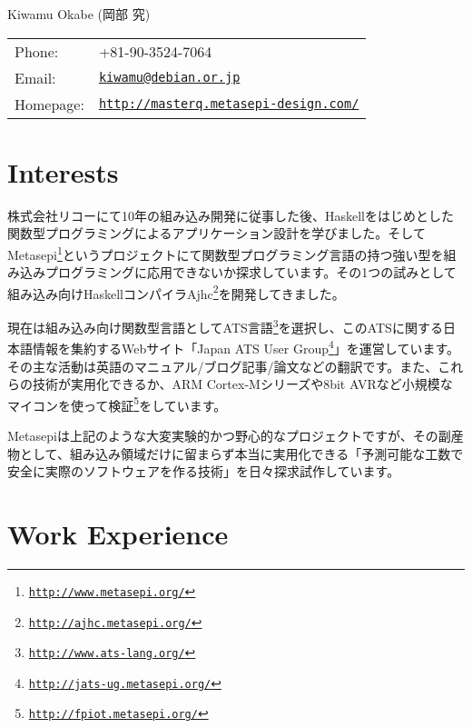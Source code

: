 \documentclass[letterpaper]{article}
\def\name{Kiwamu Okabe (岡部 究)}
\begin{document}
{\huge \name}


\vspace{0.25in}

\begin{minipage}{0.3\linewidth}
  \begin{tabular}{ll}
    Phone: & +81-90-3524-7064 \\
    Email: & \href{mailto:kiwamu@debian.or.jp}{\tt kiwamu@debian.or.jp} \\
    Homepage: & \href{http://masterq.metasepi-design.com/}{\tt http://masterq.metasepi-design.com/} \\
  \end{tabular}
\end{minipage}

\section*{Interests}

株式会社リコーにて10年の組み込み開発に従事した後、Haskellをはじめとした関数型プログラミングによるアプリケーション設計を学びました。そしてMetasepi\footnote{\href{http://www.metasepi.org/}{\tt http://www.metasepi.org/}}というプロジェクトにて関数型プログラミング言語の持つ強い型を組み込みプログラミングに応用できないか探求しています。その1つの試みとして組み込み向けHaskellコンパイラAjhc\footnote{\href{http://ajhc.metasepi.org/}{\tt http://ajhc.metasepi.org/}}を開発してきました。

現在は組み込み向け関数型言語としてATS言語\footnote{\href{http://www.ats-lang.org/}{\tt http://www.ats-lang.org/}}を選択し、このATSに関する日本語情報を集約するWebサイト「Japan ATS User Group\footnote{\href{http://jats-ug.metasepi.org/}{\tt http://jats-ug.metasepi.org/}}」を運営しています。その主な活動は英語のマニュアル/ブログ記事/論文などの翻訳です。また、これらの技術が実用化できるか、ARM Cortex-Mシリーズや8bit AVRなど小規模なマイコンを使って検証\footnote{\href{http://fpiot.metasepi.org/}{\tt http://fpiot.metasepi.org/}}をしています。

Metasepiは上記のような大変実験的かつ野心的なプロジェクトですが、その副産物として、組み込み領域だけに留まらず本当に実用化できる「予測可能な工数で安全に実際のソフトウェアを作る技術」を日々探求試作しています。

\section*{Work Experience}
\end{document}
